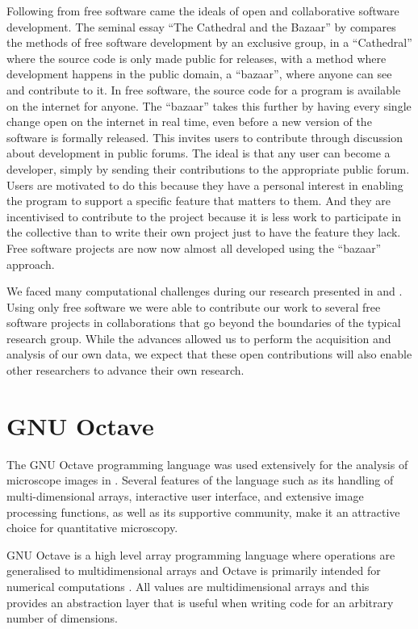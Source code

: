 Following from free software came the ideals of open and collaborative
software development.  The seminal essay ``The Cathedral and the
Bazaar'' by \citet{raymond1999-cathedral-and-bazaar} compares the
methods of free software development by an exclusive group, in a
``Cathedral'' where the source code is only made public for releases,
with a method where development
happens in the public domain, a ``bazaar'', where anyone can see
and contribute to it.
In free software, the source code for a program is available on the
internet for anyone.  The ``bazaar'' takes this further by having every
single change open on the internet in real time, even before a new version
of the software is formally released.  This invites users to contribute
through discussion about development in public forums.
The ideal is that any user can become a
developer, simply by sending their contributions to the appropriate public
forum.  Users are motivated to do this because they
have a personal interest in enabling the
program to support a specific feature that matters to them.  And they
are incentivised to contribute to the project because it is less work
to participate in the collective
than to write their own project just to have the feature
they lack.
Free software projects \citep{schindelin2012fiji, bioperl} are now
now almost all developed using the ``bazaar'' approach.

We faced many computational challenges
during our research presented in 
and .
Using only free software we were able to contribute our work to several
free software projects in collaborations that go beyond the
boundaries of the typical research group.  While the advances allowed
us to perform the acquisition and analysis of our own data,
we expect that these open contributions
will also enable other researchers to advance their own research.

\section{GNU Octave}

The GNU Octave programming language was used extensively for the analysis
of microscope images in .  Several features of the
language such as its handling of multi-dimensional arrays, interactive
user interface, and extensive image processing functions, as well as
its supportive community, make it an attractive choice
for quantitative microscopy.

GNU Octave is a high level array programming
language where operations are generalised to multidimensional arrays
and Octave is primarily intended for numerical computations \citep{octave}.
All values are multidimensional arrays and this provides
an abstraction layer that is useful when writing code for an arbitrary
number of dimensions.

